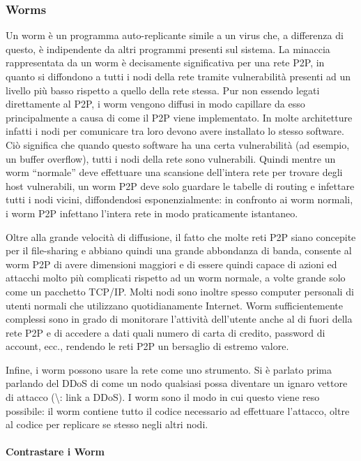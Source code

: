 \subsubsection{Worms}\label{worms}

Un worm è un programma auto-replicante simile a un virus che, a
differenza di questo, è indipendente da altri programmi presenti sul
sistema. La minaccia rappresentata da un worm è decisamente
significativa per una rete P2P, in quanto si diffondono a tutti i nodi
della rete tramite vulnerabilità presenti ad un livello più basso
rispetto a quello della rete stessa. Pur non essendo legati direttamente
al P2P, i worm vengono diffusi in modo capillare da esso principalmente
a causa di come il P2P viene implementato. In molte architetture infatti
i nodi per comunicare tra loro devono avere installato lo stesso
software. Ciò significa che quando questo software ha una certa
vulnerabilità (ad esempio, un buffer overflow), tutti i nodi della rete
sono vulnerabili. Quindi mentre un worm ``normale'' deve effettuare una
scansione dell'intera rete per trovare degli host vulnerabili, un worm
P2P deve solo guardare le tabelle di routing e infettare tutti i nodi
vicini, diffondendosi esponenzialmente: in confronto ai worm normali, i
worm P2P infettano l'intera rete in modo praticamente istantaneo.

Oltre alla grande velocità di diffusione, il fatto che molte reti P2P
siano concepite per il file-sharing e abbiano quindi una grande
abbondanza di banda, consente al worm P2P di avere dimensioni maggiori e
di essere quindi capace di azioni ed attacchi molto più complicati
rispetto ad un worm normale, a volte grande solo come un pacchetto
TCP/IP. Molti nodi sono inoltre spesso computer personali di utenti
normali che utilizzano quotidianamente Internet. Worm sufficientemente
complessi sono in grado di monitorare l'attività dell'utente anche al di
fuori della rete P2P e di accedere a dati quali numero di carta di
credito, password di account, ecc., rendendo le reti P2P un bersaglio di
estremo valore.

Infine, i worm possono usare la rete come uno strumento. Si è parlato
prima parlando del DDoS di come un nodo qualsiasi possa diventare un
ignaro vettore di attacco (\textbackslash{}\TODO: link a DDoS). I worm
sono il modo in cui questo viene reso possibile: il worm contiene tutto
il codice necessario ad effettuare l'attacco, oltre al codice per
replicare se stesso negli altri nodi.

\paragraph{Contrastare i Worm}\label{contrastare-i-worm}

